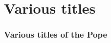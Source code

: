 \documentclass[hyperref=bookmarks]{beamer}
\begin{document}
	\section{Various titles}
	\begin{frame}
		\frametitle{Various titles of the Pope}


		



\end{frame}
\end{document}
